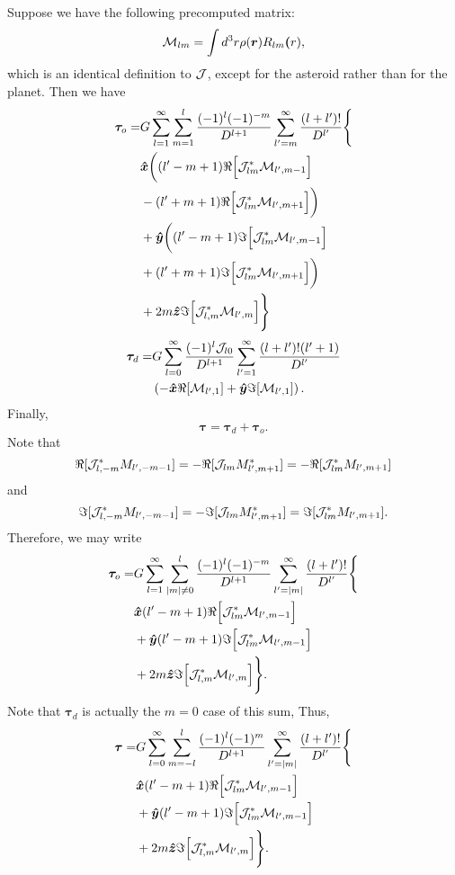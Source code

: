 \documentclass[aps,twocolumn,secnumarabic,balancelastpage,amsmath,amssymb,nofootinbib,floatfix]{revtex4-1}
\begin{document}
Suppose we have the following precomputed matrix:
$$\mathcal{M}_{lm} = \int d^3 r \rho(\bm r) R_{lm} \bm (r),$$
which is an identical definition to $\mathcal{J}$, except for the asteroid rather than for the planet. Then we have
\begin{equation*}
\begin{aligned}
\bm \tau_o = &G\sum_{l=1}^\infty \sum_{m=1}^l \frac{(-1)^l(-1)^{-m}}{D^{l+1}}\sum_{l'=m}^\infty \frac{(l+l')!}{D^{l'}}\Bigg\{\\
&\bm{\hat x}\bigg((l'-m+1)\Re\Big[\mathcal{J}^*_{lm} \mathcal{M}_{l',m-1}\Big]\\
&-(l'+m+1)\Re\Big[\mathcal{J}^*_{lm} \mathcal{M}_{l',m+1}\Big]\bigg)\\
&+\bm{\hat y}\bigg((l'-m+1)\Im\Big[\mathcal{J}^*_{lm} \mathcal{M}_{l',m-1}\Big]\\
&+(l'+m+1)\Im\Big[\mathcal{J}^*_{lm} \mathcal{M}_{l',m+1}\Big]\bigg)\\
&+2m\bm{\hat z}\Im\Big[\mathcal{J}_{l,m}^* \mathcal{M}_{l',m}\Big]\Bigg\}
\end{aligned}
\end{equation*}
\begin{equation*}
\begin{aligned}
\bm \tau_d = &G\sum_{l=0}^\infty  \frac{(-1)^l \mathcal{J}_{l0}}{D^{l+1}}\sum_{l'=1}^\infty \frac{(l+l')!(l'+1)}{D^{l'}}\\
& \left( -\bm{\hat x}\Re [\mathcal{M}_{l',1}] + \bm{\hat y}\Im [\mathcal{M}_{l',1}] \right).
\end{aligned}
\end{equation*}
Finally,
$$\bm \tau = \bm\tau_d + \bm\tau_o.$$
Note that
$$\Re[\mathcal{J}_{l,-m}^* M_{l',-m-1}]=-\Re[\mathcal{J}_{lm} M^*_{l',m+1}]=-\Re[\mathcal{J}^*_{lm} M_{l',m+1}]$$
and
$$\Im[\mathcal{J}_{l,-m}^* M_{l',-m-1}]=-\Im[\mathcal{J}_{lm} M^*_{l',m+1}]=\Im[\mathcal{J}^*_{lm} M_{l',m+1}].$$
Therefore, we may write
\begin{equation*}
\begin{aligned}
\bm \tau_o = &G\sum_{l=1}^\infty \sum_{|m|\neq 0}^l \frac{(-1)^l(-1)^{-m}}{D^{l+1}}\sum_{l'=|m|}^\infty \frac{(l+l')!}{D^{l'}}\Bigg\{\\
&\bm{\hat x}(l'-m+1)\Re\Big[\mathcal{J}^*_{lm} \mathcal{M}_{l',m-1}\Big]\\
&+\bm{\hat y}(l'-m+1)\Im\Big[\mathcal{J}^*_{lm} \mathcal{M}_{l',m-1}\Big]\\
&+2m\bm{\hat z}\Im\Big[\mathcal{J}_{l,m}^* \mathcal{M}_{l',m}\Big]\Bigg\}.
\end{aligned}
\end{equation*}
Note that $\bm \tau_d$ is actually the $m=0$ case of this sum, Thus,
\begin{equation*}
\begin{aligned}
\bm \tau = &G\sum_{l=0}^\infty \sum_{m=-l}^l \frac{(-1)^l(-1)^{m}}{D^{l+1}}\sum_{l'=|m|}^\infty \frac{(l+l')!}{D^{l'}}\Bigg\{\\
&\bm{\hat x}(l'-m+1)\Re\Big[\mathcal{J}^*_{lm} \mathcal{M}_{l',m-1}\Big]\\
&+\bm{\hat y}(l'-m+1)\Im\Big[\mathcal{J}^*_{lm} \mathcal{M}_{l',m-1}\Big]\\
&+2m\bm{\hat z}\Im\Big[\mathcal{J}_{l,m}^* \mathcal{M}_{l',m}\Big]\Bigg\}.
\end{aligned}
\end{equation*}
\end{document}
